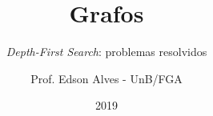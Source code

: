 \title{Grafos}
\subtitle{\textit{Depth-First Search}: problemas resolvidos}
\author{Prof. Edson Alves - UnB/FGA}
\date{2019}
